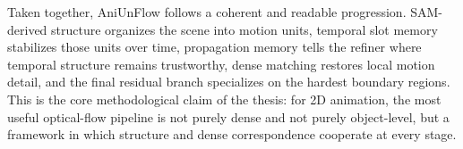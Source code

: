 Taken together, AniUnFlow follows a coherent and readable progression. SAM-derived structure organizes the scene into motion units, temporal slot memory stabilizes those units over time, propagation memory tells the refiner where temporal structure remains trustworthy, dense matching restores local motion detail, and the final residual branch specializes on the hardest boundary regions. This is the core methodological claim of the thesis: for 2D animation, the most useful optical-flow pipeline is not purely dense and not purely object-level, but a framework in which structure and dense correspondence cooperate at every stage.
